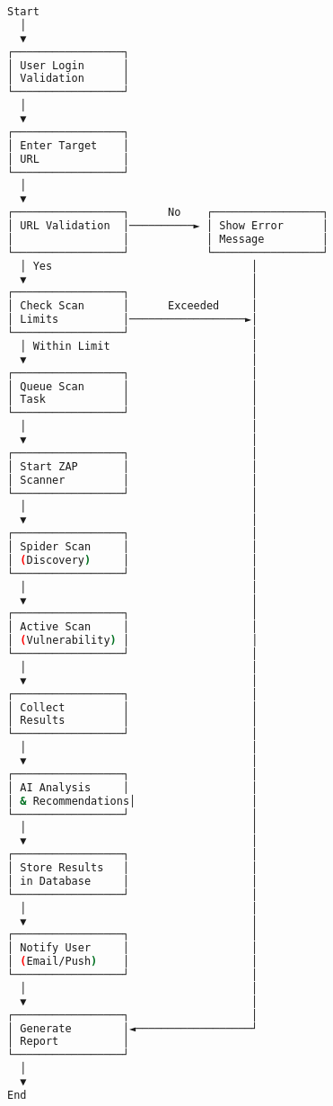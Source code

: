 \documentclass[main.tex]{subfiles}
\begin{document}
\begin{figure}[h]
\centering
\begin{lstlisting}[language=bash, caption=Security Scan Activity диаграм]
Start
  │
  ▼
┌─────────────────┐
│ User Login      │
│ Validation      │
└─────────────────┘
  │
  ▼
┌─────────────────┐
│ Enter Target    │
│ URL             │
└─────────────────┘
  │
  ▼
┌─────────────────┐      No    ┌─────────────────┐
│ URL Validation  │──────────► │ Show Error      │
│                 │            │ Message         │
└─────────────────┘            └─────────────────┘
  │ Yes                               │
  ▼                                   │
┌─────────────────┐                   │
│ Check Scan      │      Exceeded     │
│ Limits          │──────────────────►│
└─────────────────┘                   │
  │ Within Limit                      │
  ▼                                   │
┌─────────────────┐                   │
│ Queue Scan      │                   │
│ Task            │                   │
└─────────────────┘                   │
  │                                   │
  ▼                                   │
┌─────────────────┐                   │
│ Start ZAP       │                   │
│ Scanner         │                   │
└─────────────────┘                   │
  │                                   │
  ▼                                   │
┌─────────────────┐                   │
│ Spider Scan     │                   │
│ (Discovery)     │                   │
└─────────────────┘                   │
  │                                   │
  ▼                                   │
┌─────────────────┐                   │
│ Active Scan     │                   │
│ (Vulnerability) │                   │
└─────────────────┘                   │
  │                                   │
  ▼                                   │
┌─────────────────┐                   │
│ Collect         │                   │
│ Results         │                   │
└─────────────────┘                   │
  │                                   │
  ▼                                   │
┌─────────────────┐                   │
│ AI Analysis     │                   │
│ & Recommendations│                  │
└─────────────────┘                   │
  │                                   │
  ▼                                   │
┌─────────────────┐                   │
│ Store Results   │                   │
│ in Database     │                   │
└─────────────────┘                   │
  │                                   │
  ▼                                   │
┌─────────────────┐                   │
│ Notify User     │                   │
│ (Email/Push)    │                   │
└─────────────────┘                   │
  │                                   │
  ▼                                   │
┌─────────────────┐                   │
│ Generate        │◄──────────────────┘
│ Report          │
└─────────────────┘
  │
  ▼
End
\end{lstlisting}
\end{figure}
\end{document}

